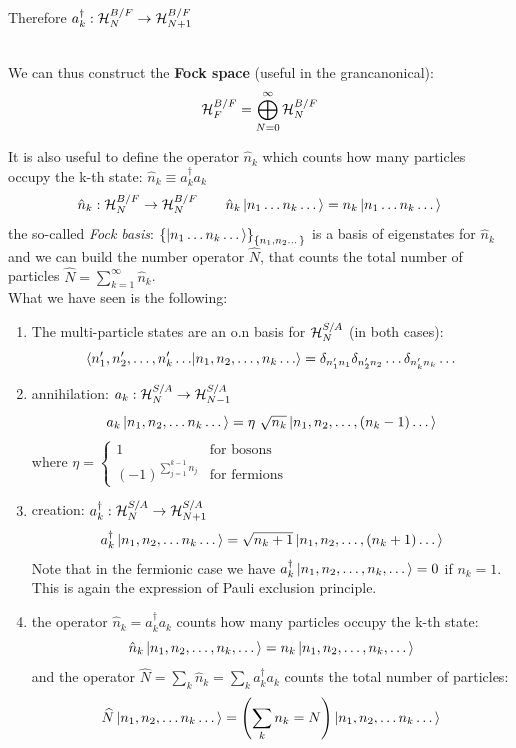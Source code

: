 Therefore \qquad $a_k^\dag : \mathcal{H}_N^{B/F} \to \mathcal{H}_{N+1}^{B/F}$

\\

We can thus construct the \textbf{Fock space} (useful in the grancanonical):
$$\mathcal{H}_F^{B/F} = \bigoplus_{N=0}^\infty \mathcal{H}_N^{B/F}$$

It is also useful to define the operator $\hat n_k$ which counts how many particles occupy the k-th state: $\hat n_k \equiv a_k^\dag a_k$
$$\hat n_k: \mathcal{H}_N^{B/F} \to \mathcal{H}_N^{B/F} \qquad \hat n_k \left|n_1\dots n_k\dots\right\rangle = n_k \left|n_1 \dots n_k\dots\right\rangle$$
the so-called \textit{Fock basis}: $\left\{\left|n_1 \dots n_k\dots\right\rangle\right\}_{\left\{n_1,n_2\dots\right\}}$ is a basis of eigenstates for $\hat n_k$\\
and we can build the number operator $\widehat N$, that counts the total number of particles $\widehat N = \sum_{k=1}^\infty \hat n_k$.\\

What we have seen is the following:\\
\Th \begin{enumerate}
    \item The multi-particle states are an o.n basis for $\mathcal{H}_N^{S/A}$ (in both cases):
    $$\braket{n_1',n_2', \dots, n_k' \dots}{n_1,n_2,\dots, n_k\dots} = \delta_{n_1'n_1}\delta_{n_2'n_2}\dots \delta_{n_k'n_k} \dots$$
    
    \item annihilation: \qquad $ a_k : \mathcal{H}_N^{S/A} \to \mathcal{H}_{N-1}^{S/A}$
    $$ a_k\left|n_1,n_2, \dots n_k\dots\right\rangle = \eta \ \sqrt{n_k} \left|n_1, n_2, \dots , (n_k-1) \dots\right\rangle$$
    where $\eta = \begin{cases} 1 &\text{for bosons} \\ (-1)^{\sum_{j=1}^{k-1} n_j} &\text{for fermions}\end{cases}$\\
    
    \item creation: \qquad $a_k^\dag : \mathcal{H}_N^{S/A} \to \mathcal{H}_{N+1}^{S/A}$
    $$ a_k^\dag\left|n_1,n_2, \dots n_k\dots\right\rangle = \sqrt{n_k+1} \left|n_1, n_2, \dots , (n_k+1) \dots\right\rangle$$
    Note that in the fermionic case we have $a_k^\dag \left|n_1,n_2, \dots, n_k, \dots\right\rangle = 0$ if $n_k = 1$. This is again the expression of Pauli exclusion principle.

    \item the operator $\hat n_k = a_k^\dag a_k$ counts how many particles occupy the k-th state:
    $$\hat n_k \left|n_1,n_2,\dots, n_k,\dots\right\rangle = n_k \left|n_1,n_2, \dots, n_k, \dots\right\rangle$$
    and the operator $\widehat N = \sum_k \hat n_k = \sum_k a_k^\dag a_k$ counts the total number of particles:
    $$ \widehat N\left|n_1,n_2, \dots n_k\dots\right\rangle = \left(\sum_k n_k = N\right) \left|n_1,n_2, \dots n_k\dots\right\rangle$$
\end{enumerate}

